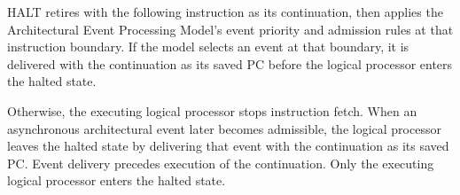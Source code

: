 HALT retires with the following instruction as its continuation, then applies the Architectural Event Processing
Model's event priority and admission rules at that instruction boundary. If the model selects an event at that
boundary, it is delivered with the continuation as its saved PC before the logical processor enters the halted state.

Otherwise, the executing logical processor stops instruction fetch. When an asynchronous architectural event later
becomes admissible, the logical processor leaves the halted state by delivering that event with the continuation as
its saved PC. Event delivery precedes execution of the continuation. Only the executing logical processor enters
the halted state.
